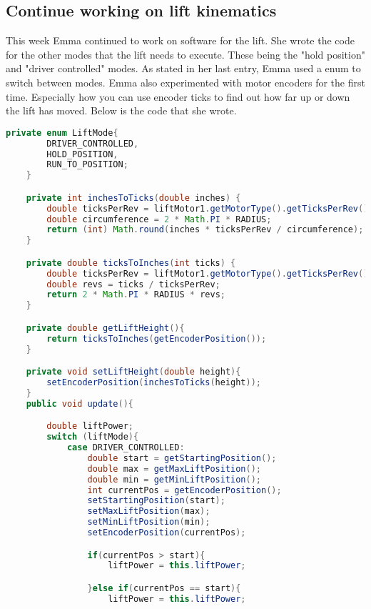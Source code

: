 \documentclass{article}
\newif\ifcontents
\begin{document}
\contentsfalse

\subsection{Continue working on lift kinematics}
This week Emma continued to work on software for the lift. She wrote the code for the other modes that the lift needs to execute. These being the "hold position" and "driver controlled" modes. As stated in her last entry, Emma used a enum to switch between modes. Emma also experimented with motor encoders for the first time. Especially how you can use encoder ticks to find out how far up or down the lift has moved. Below is the code that she wrote. 
\begin{lstlisting}[language=Java] 
    private enum LiftMode{
        DRIVER_CONTROLLED,
        HOLD_POSITION,
        RUN_TO_POSITION;
    }

    private int inchesToTicks(double inches) {
        double ticksPerRev = liftMotor1.getMotorType().getTicksPerRev();
        double circumference = 2 * Math.PI * RADIUS;
        return (int) Math.round(inches * ticksPerRev / circumference);
    }

    private double ticksToInches(int ticks) {
        double ticksPerRev = liftMotor1.getMotorType().getTicksPerRev();
        double revs = ticks / ticksPerRev;
        return 2 * Math.PI * RADIUS * revs;
    }

    private double getLiftHeight(){
        return ticksToInches(getEncoderPosition());
    }

    private void setLiftHeight(double height){
        setEncoderPosition(inchesToTicks(height));
    }
    public void update(){

        double liftPower;
        switch (liftMode){
            case DRIVER_CONTROLLED:
                double start = getStartingPosition();
                double max = getMaxLiftPosition();
                double min = getMinLiftPosition();
                int currentPos = getEncoderPosition();
                setStartingPosition(start);
                setMaxLiftPosition(max);
                setMinLiftPosition(min);
                setEncoderPosition(currentPos);

                if(currentPos > start){
                    liftPower = this.liftPower;

                }else if(currentPos == start){
                    liftPower = this.liftPower;


\end{lstlisting}
\end{document}
